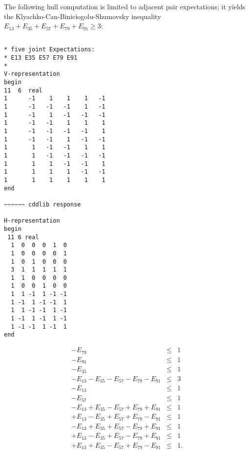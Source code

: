 \documentclass[%
 showpacs,
 showkeys,
 preprintnumbers,
 amsmath,amssymb,
 aps,
  pra,
  longbibliography,
 floatfix,
 ]{revtex4-1}
\begin{document}
The following hull computation is limited to adjacent pair expectations;
it yields the Klyachko-Can-Biniciogolu-Shumovsky inequality
$  E_{13}  + E_{35}  + E_{57}  + E_{79}  + E_{91}   \ge 3   $:

{ \begin{lstlisting}[backgroundcolor=\color{yellow!10},framerule=0pt,breaklines=true, frame=tb]

* five joint Expectations:
* E13 E35 E57 E79 E91
*
V-representation
begin
11  6  real
1      -1    1    1    1   -1
1      -1   -1   -1    1   -1
1      -1    1   -1   -1   -1
1      -1   -1    1    1    1
1      -1   -1   -1   -1    1
1      -1   -1    1   -1   -1
1       1   -1   -1    1    1
1       1   -1   -1   -1   -1
1       1    1   -1   -1    1
1       1    1    1   -1   -1
1       1    1    1    1    1
end

~~~~~~ cddlib response

H-representation
begin
 11 6 real
  1  0  0  0  1  0
  1  0  0  0  0  1
  1  0  1  0  0  0
  3  1  1  1  1  1
  1  1  0  0  0  0
  1  0  0  1  0  0
  1  1 -1  1 -1 -1
  1 -1  1 -1 -1  1
  1  1 -1 -1  1 -1
  1 -1  1 -1  1 -1
  1 -1 -1  1 -1  1
end

\end{lstlisting}  }

\begin{eqnarray}
                                 - E_{79}             &\le& 1       \\
                                           - E_{91}   &\le& 1       \\
             - E_{35}                                 &\le& 1       \\
   - E_{13}  - E_{35}  - E_{57}  - E_{79}  - E_{91}   &\le& 3       \\
   - E_{13}                                           &\le& 1       \\
                       - E_{57}                       &\le& 1       \\
   - E_{13}  + E_{35}  - E_{57}  + E_{79}  + E_{91}   &\le& 1       \\
   + E_{13}  - E_{35}  + E_{57}  + E_{79}  - E_{91}   &\le& 1       \\
   - E_{13}  + E_{35}  + E_{57}  - E_{79}  + E_{91}   &\le& 1       \\
   + E_{13}  - E_{35}  + E_{57}  - E_{79}  + E_{91}   &\le& 1       \\
   + E_{13}  + E_{35}  - E_{57}  + E_{79}  - E_{91}   &\le& 1
.
\label{2017-b-kl-e-i}
\end{eqnarray}
\end{document}
